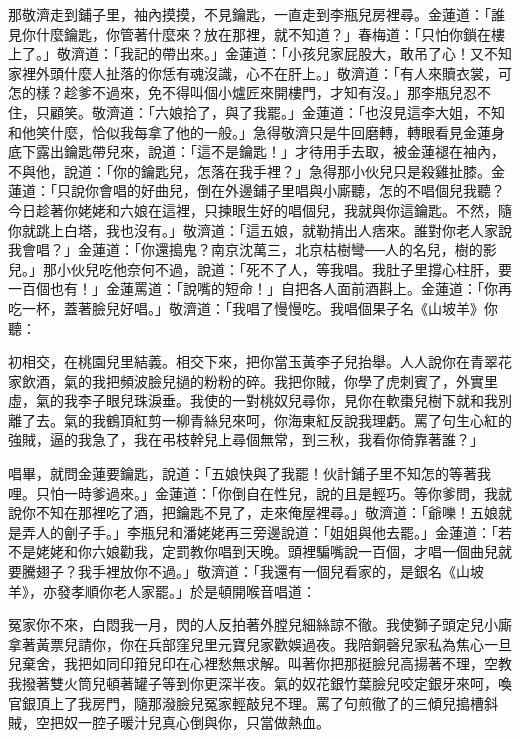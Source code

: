 那敬濟走到鋪子里，袖內摸摸，不見鑰匙，一直走到李瓶兒房裡尋。金蓮道：「誰見你什麼鑰匙，你管著什麼來？放在那裡，就不知道？」春梅道：「只怕你鎖在樓上了。」敬濟道：「我記的帶出來。」金蓮道：「小孩兒家屁股大，敢吊了心！又不知家裡外頭什麼人扯落的你恁有魂沒識，心不在肝上。」敬濟道：「有人來贖衣裳，可怎的樣？趁爹不過來，免不得叫個小爐匠來開樓門，才知有沒。」那李瓶兒忍不住，只顧笑。敬濟道：「六娘拾了，與了我罷。」金蓮道：「也沒見這李大姐，不知和他笑什麼，恰似我每拿了他的一般。」急得敬濟只是牛回磨轉，轉眼看見金蓮身底下露出鑰匙帶兒來，說道：「這不是鑰匙！」才待用手去取，被金蓮褪在袖內，不與他，說道：「你的鑰匙兒，怎落在我手裡？」急得那小伙兒只是殺雞扯膝。金蓮道：「只說你會唱的好曲兒，倒在外邊鋪子里唱與小廝聽，怎的不唱個兒我聽？今日趁著你姥姥和六娘在這裡，只揀眼生好的唱個兒，我就與你這鑰匙。不然，隨你就跳上白塔，我也沒有。」敬濟道：「這五娘，就勒掯出人痞來。誰對你老人家說我會唱？」金蓮道：「你還搗鬼？南京沈萬三，北京枯樹彎──人的名兒，樹的影兒。」那小伙兒吃他奈何不過，說道：「死不了人，等我唱。我肚子里撐心柱肝，要一百個也有！」金蓮罵道：「說嘴的短命！」自把各人面前酒斟上。金蓮道：「你再吃一杯，蓋著臉兒好唱。」敬濟道：「我唱了慢慢吃。我唱個果子名《山坡羊》你聽：

初相交，在桃園兒里結義。相交下來，把你當玉黃李子兒抬舉。人人說你在青翠花家飲酒，氣的我把頻波臉兒撾的粉粉的碎。我把你賊，你學了虎刺賓了，外實里虛，氣的我李子眼兒珠淚垂。我使的一對桃奴兒尋你，見你在軟棗兒樹下就和我別離了去。氣的我鶴頂紅剪一柳青絲兒來呵，你海東紅反說我理虧。罵了句生心紅的強賊，逼的我急了，我在弔枝幹兒上尋個無常，到三秋，我看你倚靠著誰？」

唱畢，就問金蓮要鑰匙，說道：「五娘快與了我罷！伙計鋪子里不知怎的等著我哩。只怕一時爹過來。」金蓮道：「你倒自在性兒，說的且是輕巧。等你爹問，我就說你不知在那裡吃了酒，把鑰匙不見了，走來俺屋裡尋。」敬濟道：「爺嚛！五娘就是弄人的劊子手。」李瓶兒和潘姥姥再三旁邊說道：「姐姐與他去罷。」金蓮道：「若不是姥姥和你六娘勸我，定罰教你唱到天晚。頭裡騙嘴說一百個，才唱一個曲兒就要騰翅子？我手裡放你不過。」敬濟道：「我還有一個兒看家的，是銀名《山坡羊》，亦發孝順你老人家罷。」於是頓開喉音唱道：

冤家你不來，白悶我一月，閃的人反拍著外膛兒細絲諒不徹。我使獅子頭定兒小廝拿著黃票兒請你，你在兵部窪兒里元寶兒家歡娛過夜。我陪銅磬兒家私為焦心一旦兒棄舍，我把如同印箝兒印在心裡愁無求解。叫著你把那挺臉兒高揚著不理，空教我撥著雙火筒兒頓著罐子等到你更深半夜。氣的奴花銀竹葉臉兒咬定銀牙來呵，喚官銀頂上了我房門，隨那潑臉兒冤家輕敲兒不理。罵了句煎徹了的三傾兒搗槽斜賊，空把奴一腔子暖汁兒真心倒與你，只當做熱血。

